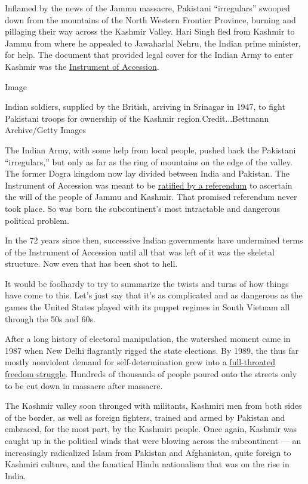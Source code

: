 Inflamed by the news of the Jammu massacre, Pakistani ``irregulars''
swooped down from the mountains of the North Western Frontier Province,
burning and pillaging their way across the Kashmir Valley. Hari Singh
fled from Kashmir to Jammu from where he appealed to Jawaharlal Nehru,
the Indian prime minister, for help. The document that provided legal
cover for the Indian Army to enter Kashmir was the
\href{https://thewire.in/history/public-first-time-jammu-kashmirs-instrument-accession-india}{Instrument
of Accession}.

Image

Indian soldiers, supplied by the British, arriving in Srinagar in 1947,
to fight Pakistani troops for ownership of the Kashmir
region.Credit...Bettmann Archive/Getty Images

The Indian Army, with some help from local people, pushed back the
Pakistani ``irregulars,'' but only as far as the ring of mountains on
the edge of the valley. The former Dogra kingdom now lay divided between
India and Pakistan. The Instrument of Accession was meant to be
\href{https://undocs.org/S/RES/47(1948)}{ratified by a referendum} to
ascertain the will of the people of Jammu and Kashmir. That promised
referendum never took place. So was born the subcontinent's most
intractable and dangerous political problem.

In the 72 years since then, successive Indian governments have
undermined terms of the Instrument of Accession until all that was left
of it was the skeletal structure. Now even that has been shot to hell.

It would be foolhardy to try to summarize the twists and turns of how
things have come to this. Let's just say that it's as complicated and as
dangerous as the games the United States played with its puppet regimes
in South Vietnam all through the 50s and 60s.

After a long history of electoral manipulation, the watershed moment
came in 1987 when New Delhi flagrantly rigged the state elections. By
1989, the thus far mostly nonviolent demand for self-determination grew
into a
\href{https://www.nybooks.com/articles/2000/09/21/death-in-kashmir/}{full-throated
freedom struggle}. Hundreds of thousands of people poured onto the
streets only to be cut down in massacre after massacre.

The Kashmir valley soon thronged with militants, Kashmiri men from both
sides of the border, as well as foreign fighters, trained and armed by
Pakistan and embraced, for the most part, by the Kashmiri people. Once
again, Kashmir was caught up in the political winds that were blowing
across the subcontinent --- an increasingly radicalized Islam from
Pakistan and Afghanistan, quite foreign to Kashmiri culture, and the
fanatical Hindu nationalism that was on the rise in India.

